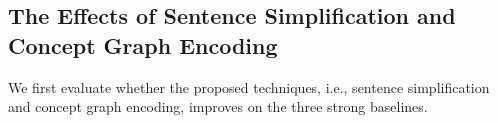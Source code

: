 %
%
%
%
 
\subsection{The Effects of Sentence Simplification and 
Concept Graph Encoding}
\label{sec:result}

We first evaluate whether the proposed techniques, i.e.,
sentence simplification and concept graph encoding, 
improves on the three strong baselines. 

\begin{table}[H]
\scriptsize
\centering
{}
\caption{End-to-end accuracy on SCT test set with sentence simplification and 
concept graph encodings. 
Original=baseline, SS=sentence simplification, CG=concept graph.}
\label{tab:main}
\end{table}


